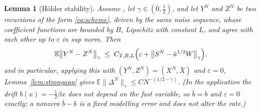 \documentclass[a4paper,fleqn]{cas-dc}
\newtheorem{lemma}[theorem]{Lemma}
\theoremstyle{definition}
\newcommand{\E}{\mathbb{E}}
\begin{document}
\begin{lemma}[H\"older stability]
\label{lem:holder}
Assume , let $\gamma\in(0,\tfrac12)$, and let $Y^{N}$ and $Z^{N}$ be
two recursions of the form \eqref{eq:scheme}, driven by the same noise sequence, whose
coefficient functions are bounded by $B$, Lipschitz with constant $L$, and agree with
each other up to $\varepsilon$ in sup norm. Then
\begin{equation}
\E\bigl\lVert Y^{N}-Z^{N}\bigr\rVert_{\gamma}
\;\le\; C_{T,B,L}\Bigl(\varepsilon
+\bigl\lVert S^{N}-\bar a^{1/2}W\bigr\rVert_{\gamma}\Bigr),
\label{eq:stab}
\end{equation}
and in particular, applying this with $(Y^{N},Z^{N})=(X^{N},\bar X)$ and
$\varepsilon=0$, Lemma~\ref{lem:strongapp} gives
$\E\lVert\Delta^{N}\rVert_{\gamma}\le C N^{-(1/2-\gamma)}$. (In the application the
drift $b(x)=-\tfrac12\beta x$ does not depend on the fast variable, so $\bar b=b$ and
$\varepsilon=0$ exactly; a nonzero $\bar b-b$ is a fixed modelling error and does not
alter the rate.)
\end{lemma}
\end{document}
